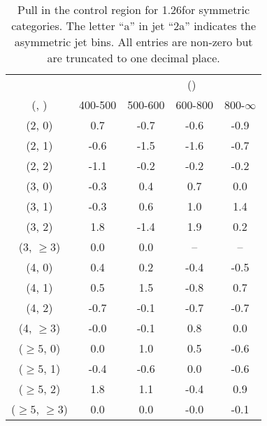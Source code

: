 \begin{table}[h!]
\tiny
\centering
\caption{Pull in the \gj control region for 1.26\ifb for symmetric categories. The letter ``a'' in jet \eg ``2a''  indicates the asymmetric jet bins. All entries are non-zero but are truncated to one decimal place.\label{tab:pullsep_gj_ewk_sym}}
\begin{tabular}
{ccccc}
	\hline\hline
&	& \multicolumn{4}{c}{\scalht (\gev)} \\ 
	 (\njet,  \nb) & 400-500 & 500-600 & 600-800 & 800-$\infty$ \\ [0.8ex] 
\hline
	(2, 0) & 0.7 & -0.7 & -0.6 & -0.9 \\[0.5ex] 
	(2, 1) & -0.6 & -1.5 & -1.6 & -0.7 \\[0.5ex] 
	(2, 2) & -1.1 & -0.2 & -0.2 & -0.2 \\[0.5ex] 
	(3, 0) & -0.3 & 0.4 & 0.7 & 0.0 \\[0.5ex] 
	(3, 1) & -0.3 & 0.6 & 1.0 & 1.4 \\[0.5ex] 
	(3, 2) & 1.8 & -1.4 & 1.9 & 0.2 \\[0.5ex] 
	(3, $\ge3$) & 0.0 & 0.0 & -- & -- \\[0.5ex] 
	(4, 0) & 0.4 & 0.2 & -0.4 & -0.5 \\[0.5ex] 
	(4, 1) & 0.5 & 1.5 & -0.8 & 0.7 \\[0.5ex] 
	(4, 2) & -0.7 & -0.1 & -0.7 & -0.7 \\[0.5ex] 
	(4, $\ge3$) & -0.0 & -0.1 & 0.8 & 0.0 \\[0.5ex] 
	($\ge5$, 0) & 0.0 & 1.0 & 0.5 & -0.6 \\[0.5ex] 
	($\ge5$, 1) & -0.4 & -0.6 & 0.0 & -0.6 \\[0.5ex] 
	($\ge5$, 2) & 1.8 & 1.1 & -0.4 & 0.9 \\[0.5ex] 
	($\ge5$, $\ge3$) & 0.0 & 0.0 & -0.0 & -0.1 \\[0.5ex] 
	\hline
	\hline
\end{tabular}
\end{table}
